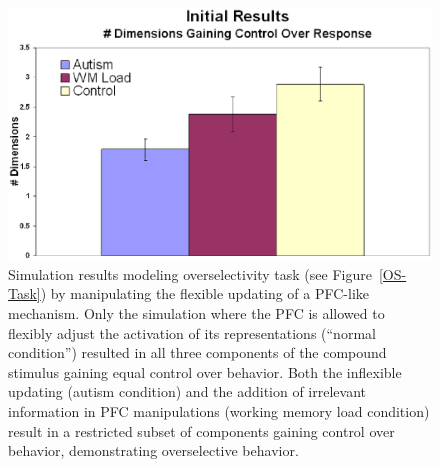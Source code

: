 \begin{figure}
\begin{center}
	\includegraphics[width=125mm]{graphs/overselectivity_results_new.eps}
\end{center}
\caption{Simulation results modeling overselectivity task (see Figure~\ref{OS-Task}) by manipulating the flexible updating of a PFC-like mechanism. Only the simulation where the PFC is allowed to flexibly adjust the activation of its representations (``normal condition'') resulted in all three components of the compound stimulus gaining equal control over behavior.  Both the inflexible updating (autism condition) and the addition of irrelevant information in PFC manipulations (working memory load condition) result in a restricted subset of components gaining control over behavior, demonstrating overselective behavior.}
\label{OS-Model-Results-2}
\end{figure} 

